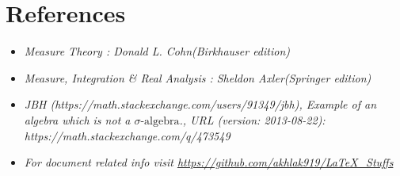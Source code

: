 \documentclass[12pt, a4paper]{article} %
\begin{document}
\newpage

\section{References}

\begin{itemize}
    \item \slshape Measure Theory : Donald L. Cohn(Birkhauser edition)
    \item \slshape Measure, Integration \& Real Analysis : Sheldon Axler(Springer edition)
    \item \slshape JBH (https://math.stackexchange.com/users/91349/jbh), Example of an algebra which is not a $\sigma\mbox{-algebra}$., URL (version: 2013-08-22): https://math.stackexchange.com/q/473549
    \item \slshape For document related info visit \url{https://github.com/akhlak919/LaTeX_Stuffs}
\end{itemize}
\end{document}
